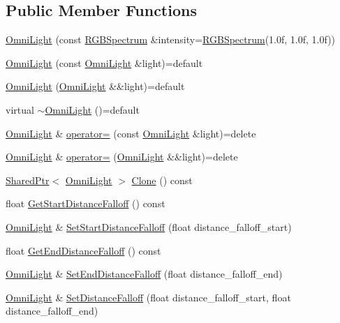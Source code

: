 \subsection*{Public Member Functions}
\begin{DoxyCompactItemize}
\item 
\hyperlink{classmage_1_1_omni_light_a94794dd7c19fcac0c0d0b9d83108513b}{Omni\+Light} (const \hyperlink{structmage_1_1_r_g_b_spectrum}{R\+G\+B\+Spectrum} \&intensity=\hyperlink{structmage_1_1_r_g_b_spectrum}{R\+G\+B\+Spectrum}(1.\+0f, 1.\+0f, 1.\+0f))
\item 
\hyperlink{classmage_1_1_omni_light_a090be5e95e1c3d6c43e80ad7fae10794}{Omni\+Light} (const \hyperlink{classmage_1_1_omni_light}{Omni\+Light} \&light)=default
\item 
\hyperlink{classmage_1_1_omni_light_ae844308b4199f9c75c38512e8d8ad5e7}{Omni\+Light} (\hyperlink{classmage_1_1_omni_light}{Omni\+Light} \&\&light)=default
\item 
virtual \hyperlink{classmage_1_1_omni_light_a9a741cc7e5e11d386c7a032df2d231a3}{$\sim$\+Omni\+Light} ()=default
\item 
\hyperlink{classmage_1_1_omni_light}{Omni\+Light} \& \hyperlink{classmage_1_1_omni_light_a4928e08d5e5168b2eede7ecc84b1686d}{operator=} (const \hyperlink{classmage_1_1_omni_light}{Omni\+Light} \&light)=delete
\item 
\hyperlink{classmage_1_1_omni_light}{Omni\+Light} \& \hyperlink{classmage_1_1_omni_light_a530be023cc5eb9a0dd795da3aa40934e}{operator=} (\hyperlink{classmage_1_1_omni_light}{Omni\+Light} \&\&light)=delete
\item 
\hyperlink{namespacemage_a1e01ae66713838a7a67d30e44c67703e}{Shared\+Ptr}$<$ \hyperlink{classmage_1_1_omni_light}{Omni\+Light} $>$ \hyperlink{classmage_1_1_omni_light_a942f31912bac5f56b37f1ebca7ff09ad}{Clone} () const
\item 
float \hyperlink{classmage_1_1_omni_light_ab37a3e3880f519f40f9c9eaa786ba769}{Get\+Start\+Distance\+Falloff} () const
\item 
\hyperlink{classmage_1_1_omni_light}{Omni\+Light} \& \hyperlink{classmage_1_1_omni_light_a3d8adcbc2e6c712eae738ddfd47454f6}{Set\+Start\+Distance\+Falloff} (float distance\+\_\+falloff\+\_\+start)
\item 
float \hyperlink{classmage_1_1_omni_light_ac3a8638331aa35ffd8967ccc78ca2df7}{Get\+End\+Distance\+Falloff} () const
\item 
\hyperlink{classmage_1_1_omni_light}{Omni\+Light} \& \hyperlink{classmage_1_1_omni_light_a45990ae06ca074654247d70f85e98094}{Set\+End\+Distance\+Falloff} (float distance\+\_\+falloff\+\_\+end)
\item 
\hyperlink{classmage_1_1_omni_light}{Omni\+Light} \& \hyperlink{classmage_1_1_omni_light_a148c13f7b6191c88f069730777d31eb3}{Set\+Distance\+Falloff} (float distance\+\_\+falloff\+\_\+start, float distance\+\_\+falloff\+\_\+end)
\end{DoxyCompactItemize}
